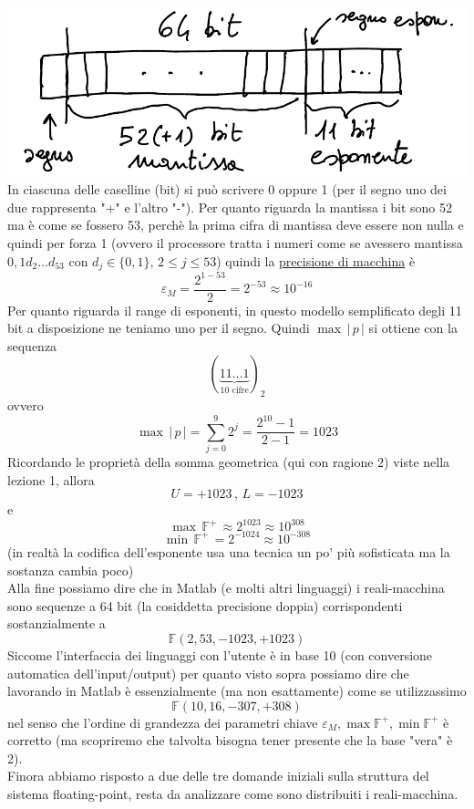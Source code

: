 \documentclass[12pt]{article}
\begin{document}
\includegraphics[width=\linewidth]{img4}
In ciascuna delle caselline (bit) si può scrivere 0 oppure 1 (per il segno uno dei due rappresenta "+" e l'altro "-"). Per quanto riguarda la mantissa i bit sono 52 ma è come se fossero 53, perchè la prima cifra di mantissa deve essere non nulla e quindi per forza 1 (ovvero il processore tratta i numeri come se avessero mantissa $0,1 d_2 \dotsc d_{53}$ con $d_j \in \{0,1\},\, 2 \le j \le 53$) quindi la \underline{precisione di macchina} è
\[ \varepsilon_M = \frac{2^{1-53}}{2} = 2^{-53} \approx 10^{-16}\]
Per quanto riguarda il range di esponenti, in questo modello semplificato degli 11 bit a disposizione ne teniamo uno per il segno. Quindi $\max \, \lvert \, p \, \rvert$ si ottiene con la sequenza
\[ (\underbrace{11\dotsc1}_{\text{10 cifre}})_2 \]
ovvero
\[ \max \, \lvert \, p \, \rvert = \sum_{j=0}^9 2^j = \frac{2^{10} - 1}{2 - 1} = 1023 \]
Ricordando le proprietà della somma geometrica (qui con ragione 2) viste nella lezione 1, allora \[ U = +1023 \,,\, L = -1023 \] e
\[ \max \, \mathbb{F}^+ \, \approx 2^{1023} \approx 10^{308}\]
\[ \min \, \mathbb{F}^+ \, = 2^{-1024} \approx 10^{-308}\]
(in realtà la codifica dell'esponente usa una tecnica un po' più sofisticata ma la sostanza cambia poco) \\
Alla fine possiamo dire che in Matlab (e molti altri linguaggi) i reali-macchina sono sequenze a 64 bit (la cosiddetta precisione doppia) corrispondenti sostanzialmente a
\[ \mathbb{F}(2, 53, -1023, +1023) \]
Siccome l'interfaccia dei linguaggi con l'utente è in base 10 (con conversione automatica dell'input/output) per quanto visto sopra possiamo dire che lavorando in Matlab è essenzialmente (ma non esattamente) come se utilizzassimo
\[ \mathbb{F}(10, 16, -307, +308) \]
nel senso che l'ordine di grandezza dei parametri chiave $\varepsilon_M, \max \mathbb{F}^+, \min \mathbb{F}^+$ è corretto (ma scopriremo che talvolta bisogna tener presente che la base "vera" è 2). \\
Finora abbiamo risposto a due delle tre domande iniziali sulla struttura del sistema floating-point, resta da analizzare come sono distribuiti i reali-macchina. \\
\end{document}
